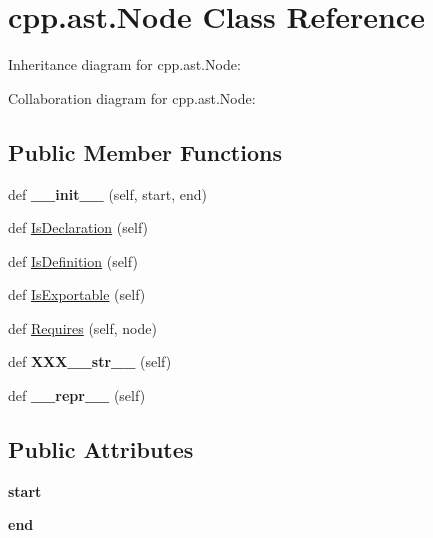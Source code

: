 \hypertarget{classcpp_1_1ast_1_1Node}{}\section{cpp.\+ast.\+Node Class Reference}
\label{classcpp_1_1ast_1_1Node}


Inheritance diagram for cpp.\+ast.\+Node\+:


Collaboration diagram for cpp.\+ast.\+Node\+:
\subsection*{Public Member Functions}
\begin{DoxyCompactItemize}
\item 
\mbox{\label{classcpp_1_1ast_1_1Node_a2cbd6969346645259afc3be51faae904}} 
def {\bfseries \+\_\+\+\_\+init\+\_\+\+\_\+} (self, start, end)
\item 
def \hyperlink{classcpp_1_1ast_1_1Node_ab3eca703a79fb65bc25dfbcb7547c79e}{Is\+Declaration} (self)
\item 
def \hyperlink{classcpp_1_1ast_1_1Node_a684ee9a357168e7e07a24fc6812f66e6}{Is\+Definition} (self)
\item 
def \hyperlink{classcpp_1_1ast_1_1Node_a313273874ccf578485006d4000128234}{Is\+Exportable} (self)
\item 
def \hyperlink{classcpp_1_1ast_1_1Node_a31ae211f954a8c578ef16226df5ac8c8}{Requires} (self, node)
\item 
\mbox{\label{classcpp_1_1ast_1_1Node_ab5dfeabcbcd7c1f5feb8522edffb8b4a}} 
def {\bfseries X\+X\+X\+\_\+\+\_\+str\+\_\+\+\_\+} (self)
\item 
\mbox{\label{classcpp_1_1ast_1_1Node_ab89915656a60c7b7c752e5baa607c532}} 
def {\bfseries \+\_\+\+\_\+repr\+\_\+\+\_\+} (self)
\end{DoxyCompactItemize}
\subsection*{Public Attributes}
\begin{DoxyCompactItemize}
\item 
\mbox{\label{classcpp_1_1ast_1_1Node_a7b2aa97e6a049bb1a93aea48c48f1f44}} 
{\bfseries start}
\item 
\mbox{\label{classcpp_1_1ast_1_1Node_a3c5e5246ccf619df28eca02e29d69647}} 
{\bfseries end}
\end{DoxyCompactItemize}


